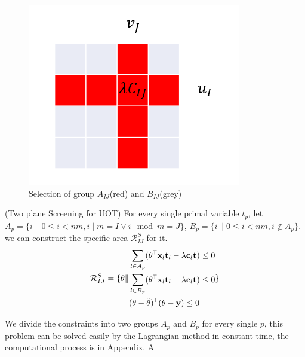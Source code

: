 	\begin{figure}[h]
	\begin{center}	
	\includegraphics[width = \linewidth]{pic/divide}
	\caption{Selection of group $A_{IJ}$(red) and $B_{IJ}$(grey)}
	\end{center}	
	\end{figure}

\begin{thm}\label{area}(Two plane Screening for UOT) For every single primal variable $t_p$, let $A_p = \{ i \| 0\leq i<nm, i\mid m = I \vee i\mod m = J\}$, $B_p = \{ i \| 0\leq i<nm, i \notin A_p\}$. we can construct the specific area $\mathcal{R}^{S}_{IJ}$ for it.
 \begin{equation}
\begin{split} 
\mathcal{R}^S_{IJ} = \{\theta \|
\begin{aligned}
 &\sum_{l\in A_p}(\theta^{\mathsf T}\mathbf{x}_{l}\mathbf t_l - \lambda \mathbf c_l \mathbf t)\leq 0 \\
 &\sum_{l\in B_p}(\theta^{\mathsf T}\mathbf{x}_{l}\mathbf t_l - \lambda \mathbf c_l \mathbf t)\leq 0 \\
  &(\theta-\tilde{\theta})^{\mathsf T}(\theta-\mathbf y)\leq 0
\end{aligned}
\}
\end{split}
\label{eq:divide}
\end{equation}
\end{thm}
We divide the constraints into two groups $A_p$ and $B_p$ for every single $p$, this problem can be solved easily by the Lagrangian method in constant time, the computational process is in Appendix. A



